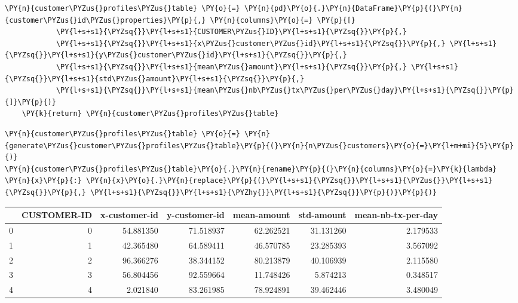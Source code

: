 \begin{tcolorbox}[breakable, size=fbox, boxrule=1pt, pad at break*=1mm,colback=cellbackground, colframe=cellborder]
\begin{Verbatim}[commandchars=\\\{\}]
    \PY{n}{customer\PYZus{}profiles\PYZus{}table} \PY{o}{=} \PY{n}{pd}\PY{o}{.}\PY{n}{DataFrame}\PY{p}{(}\PY{n}{customer\PYZus{}id\PYZus{}properties}\PY{p}{,} \PY{n}{columns}\PY{o}{=} \PY{p}{[}
            \PY{l+s+s1}{\PYZsq{}}\PY{l+s+s1}{CUSTOMER\PYZus{}ID}\PY{l+s+s1}{\PYZsq{}}\PY{p}{,}
            \PY{l+s+s1}{\PYZsq{}}\PY{l+s+s1}{x\PYZus{}customer\PYZus{}id}\PY{l+s+s1}{\PYZsq{}}\PY{p}{,} \PY{l+s+s1}{\PYZsq{}}\PY{l+s+s1}{y\PYZus{}customer\PYZus{}id}\PY{l+s+s1}{\PYZsq{}}\PY{p}{,}
            \PY{l+s+s1}{\PYZsq{}}\PY{l+s+s1}{mean\PYZus{}amount}\PY{l+s+s1}{\PYZsq{}}\PY{p}{,} \PY{l+s+s1}{\PYZsq{}}\PY{l+s+s1}{std\PYZus{}amount}\PY{l+s+s1}{\PYZsq{}}\PY{p}{,}
            \PY{l+s+s1}{\PYZsq{}}\PY{l+s+s1}{mean\PYZus{}nb\PYZus{}tx\PYZus{}per\PYZus{}day}\PY{l+s+s1}{\PYZsq{}}\PY{p}{]}\PY{p}{)}
    \PY{k}{return} \PY{n}{customer\PYZus{}profiles\PYZus{}table}
\end{Verbatim}
\end{tcolorbox}

    \begin{tcolorbox}[breakable, size=fbox, boxrule=1pt, pad at break*=1mm,colback=cellbackground, colframe=cellborder]
\begin{Verbatim}[commandchars=\\\{\}]
\PY{n}{customer\PYZus{}profiles\PYZus{}table} \PY{o}{=} \PY{n}{generate\PYZus{}customer\PYZus{}profiles\PYZus{}table}\PY{p}{(}\PY{n}{n\PYZus{}customers}\PY{o}{=}\PY{l+m+mi}{5}\PY{p}{)}
\PY{n}{customer\PYZus{}profiles\PYZus{}table}\PY{o}{.}\PY{n}{rename}\PY{p}{(}\PY{n}{columns}\PY{o}{=}\PY{k}{lambda} \PY{n}{x}\PY{p}{:} \PY{n}{x}\PY{o}{.}\PY{n}{replace}\PY{p}{(}\PY{l+s+s1}{\PYZsq{}}\PY{l+s+s1}{\PYZus{}}\PY{l+s+s1}{\PYZsq{}}\PY{p}{,} \PY{l+s+s1}{\PYZsq{}}\PY{l+s+s1}{\PYZhy{}}\PY{l+s+s1}{\PYZsq{}}\PY{p}{)}\PY{p}{)}
\end{Verbatim}
\end{tcolorbox}
 
            
    
    \begin{center}
\begin{tabular}{lrrrrrr}
\toprule
 & CUSTOMER-ID & x-customer-id & y-customer-id & mean-amount & std-amount & mean-nb-tx-per-day \\
\midrule
0 & 0 & 54.881350 & 71.518937 & 62.262521 & 31.131260 & 2.179533 \\
1 & 1 & 42.365480 & 64.589411 & 46.570785 & 23.285393 & 3.567092 \\
2 & 2 & 96.366276 & 38.344152 & 80.213879 & 40.106939 & 2.115580 \\
3 & 3 & 56.804456 & 92.559664 & 11.748426 & 5.874213 & 0.348517 \\
4 & 4 & 2.021840 & 83.261985 & 78.924891 & 39.462446 & 3.480049 \\
\bottomrule
\end{tabular}

\end{center}

